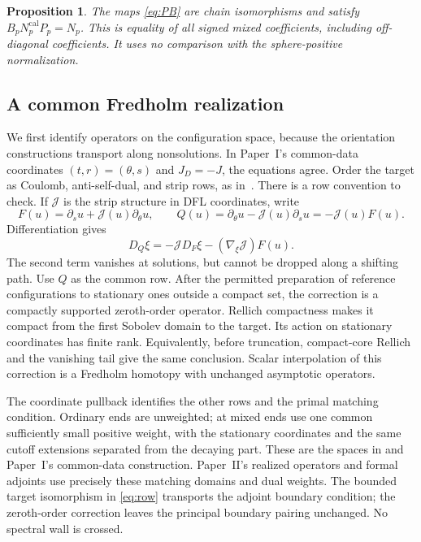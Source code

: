 \documentclass[11pt]{amsart}
\newtheorem{proposition}[theorem]{Proposition}
\theoremstyle{definition}
\theoremstyle{remark}
\theoremstyle{plain}
\newcommand{\calib}{\mathrm{cal}}
\begin{document}
\begin{proposition}\label{prop:mixed}
The maps \eqref{eq:PB} are chain isomorphisms and satisfy
$B_pN_p^{\calib}P_p=N_p$. This is equality of all signed mixed
coefficients, including off-diagonal coefficients. It uses no
comparison with the sphere-positive normalization.
\end{proposition}

\subsection{A common Fredholm realization}
We first identify operators on the configuration space, because
the orientation constructions transport along nonsolutions.
In Paper~I's common-data coordinates $(t,r)=(\theta,s)$ and
$J_D=-J$, the equations agree. Order the target as Coulomb,
anti-self-dual, and strip rows, as in~\cite[(3.16)]{DFL}.
There is a row convention to check. If $\mathcal J$ is the strip
structure in DFL coordinates, write
\[
 F(u)=\partial_su+\mathcal J(u)\partial_\theta u,
 \qquad Q(u)=\partial_\theta u-\mathcal J(u)\partial_su
             =-\mathcal J(u)F(u).
\]
Differentiation gives
\begin{equation}\label{eq:row}
 D_Q\xi=-\mathcal J D_F\xi-(\nabla_\xi\mathcal J)F(u).
\end{equation}
The second term vanishes at solutions, but cannot be dropped
along a shifting path. Use $Q$ as the common row. After the
permitted preparation of reference configurations to stationary
ones outside a compact set, the correction is a compactly
supported zeroth-order operator. Rellich compactness makes it
compact from the first Sobolev domain to the target. Its action
on stationary coordinates has finite rank. Equivalently, before
truncation, compact-core Rellich and the vanishing tail give the
same conclusion. Scalar interpolation of this correction is a
Fredholm homotopy with unchanged asymptotic operators.

The coordinate pullback identifies the other rows and the primal
matching condition. Ordinary ends are unweighted; at mixed ends
use one common sufficiently small positive weight, with the
stationary coordinates and the same cutoff extensions separated
from the decaying part. These are the spaces in
\cite[Definitions~3.8--3.9]{DFL} and Paper~I's common-data
construction. Paper~II's realized operators and formal adjoints
use precisely these matching domains and dual weights. The
bounded target isomorphism in \eqref{eq:row} transports the adjoint
boundary condition; the zeroth-order correction leaves the
principal boundary pairing unchanged. No spectral wall is crossed.
\end{document}
